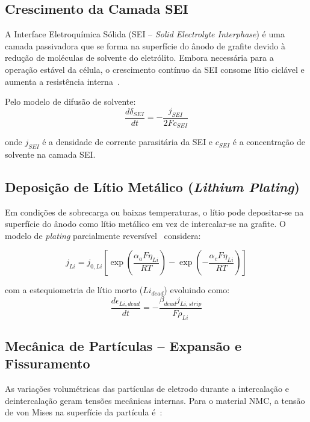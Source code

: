 \documentclass[
    12pt,
    openright,
    twoside,
    a4paper,
    brazil,
    english
]{abntex2}
\begin{document}
\subsection{Crescimento da Camada SEI}

A Interface Eletroquímica Sólida (SEI -- \textit{Solid Electrolyte Interphase})
é uma camada passivadora que se forma na superfície do ânodo de grafite devido
à redução de moléculas de solvente do eletrólito. Embora necessária para a
operação estável da célula, o crescimento contínuo da SEI consome lítio
ciclável e aumenta a resistência interna~\cite{peled2017sei}.

Pelo modelo de difusão de solvente:
\begin{equation}
  \frac{d\delta_{SEI}}{dt} = -\frac{j_{SEI}}{2F c_{SEI}}
\end{equation}

onde $j_{SEI}$ é a densidade de corrente parasitária da SEI e $c_{SEI}$ é a
concentração de solvente na camada SEI.

\subsection{Deposição de Lítio Metálico (\textit{Lithium Plating})}

Em condições de sobrecarga ou baixas temperaturas, o lítio pode depositar-se
na superfície do ânodo como lítio metálico em vez de intercalar-se na grafite.
O modelo de \textit{plating} parcialmente reversível~\cite{yang2017modeling}
considera:

\begin{equation}
  j_{Li} = j_{0,Li} \left[\exp\left(\frac{\alpha_a F \eta_{Li}}{RT}\right) -
  \exp\left(-\frac{\alpha_c F \eta_{Li}}{RT}\right)\right]
\end{equation}

com a estequiometria de lítio morto ($Li_{dead}$) evoluindo como:
\begin{equation}
  \frac{d\epsilon_{Li,dead}}{dt} = -\frac{\beta_{dead} j_{Li,strip}}{F \rho_{Li}}
\end{equation}

\subsection{Mecânica de Partículas -- Expansão e Fissuramento}

As variações volumétricas das partículas de eletrodo durante a intercalação e
deintercalação geram tensões mecânicas internas. Para o material NMC, a tensão
de von Mises na superfície da partícula é~\cite{christensen2010mechanics}:
\end{document}
